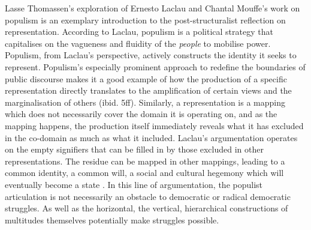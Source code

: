 Lasse Thomassen's \parencite*{thomassen2019} exploration of Ernesto Laclau and Chantal Mouffe's work on populism is an exemplary introduction to the post-structuralist reflection on representation. According to Laclau, populism is a political strategy that capitalises on the vagueness and fluidity of the \textit{people} to mobilise power. Populism, from Laclau’s perspective, actively constructs the identity it seeks to represent. Populism's especially prominent approach to redefine the boundaries of public discourse makes it a good example of how the production of a specific representation directly translates to the amplification of certain views and the marginalisation of others (ibid. 5ff). Similarly, a representation is a mapping  which does not necessarily cover the domain it is operating on, and as the mapping happens, the production itself immediately reveals what it has excluded in the co-domain as much as what it included. Laclau's argumentation operates on the empty signifiers  that can be filled in by those excluded in other representations. The residue can be mapped in other mappings, leading to a common identity, a common will, a social and cultural hegemony which will eventually become a state \parencite[546f]{thomassen2017}. In this line of argumentation, the populist articulation is not necessarily an obstacle to democratic or radical democratic struggles. As well as the horizontal, the vertical, hierarchical constructions of multitudes themselves potentially make struggles possible.

